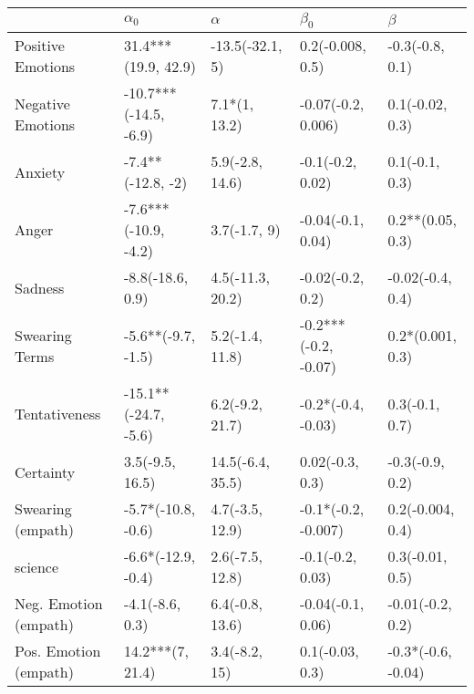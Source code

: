 \begin{tabular}{lllll}
\toprule
{} &             $\alpha_0$ &          $\alpha$ &             $\beta_0$ &             $\beta$ \\
\midrule
Positive Emotions     &    31.4***(19.9, 42.9) &   -13.5(-32.1, 5) &      0.2(-0.008, 0.5) &     -0.3(-0.8, 0.1) \\
Negative Emotions     &  -10.7***(-14.5, -6.9) &     7.1*(1, 13.2) &    -0.07(-0.2, 0.006) &     0.1(-0.02, 0.3) \\
Anxiety               &      -7.4**(-12.8, -2) &   5.9(-2.8, 14.6) &      -0.1(-0.2, 0.02) &      0.1(-0.1, 0.3) \\
Anger                 &   -7.6***(-10.9, -4.2) &      3.7(-1.7, 9) &     -0.04(-0.1, 0.04) &    0.2**(0.05, 0.3) \\
Sadness               &       -8.8(-18.6, 0.9) &  4.5(-11.3, 20.2) &      -0.02(-0.2, 0.2) &    -0.02(-0.4, 0.4) \\
Swearing Terms        &     -5.6**(-9.7, -1.5) &   5.2(-1.4, 11.8) &  -0.2***(-0.2, -0.07) &    0.2*(0.001, 0.3) \\
Tentativeness         &   -15.1**(-24.7, -5.6) &   6.2(-9.2, 21.7) &    -0.2*(-0.4, -0.03) &      0.3(-0.1, 0.7) \\
Certainty             &        3.5(-9.5, 16.5) &  14.5(-6.4, 35.5) &       0.02(-0.3, 0.3) &     -0.3(-0.9, 0.2) \\
Swearing (empath)     &     -5.7*(-10.8, -0.6) &   4.7(-3.5, 12.9) &   -0.1*(-0.2, -0.007) &    0.2(-0.004, 0.4) \\
science               &     -6.6*(-12.9, -0.4) &   2.6(-7.5, 12.8) &      -0.1(-0.2, 0.03) &     0.3(-0.01, 0.5) \\
Neg. Emotion (empath) &        -4.1(-8.6, 0.3) &   6.4(-0.8, 13.6) &     -0.04(-0.1, 0.06) &    -0.01(-0.2, 0.2) \\
Pos. Emotion (empath) &       14.2***(7, 21.4) &     3.4(-8.2, 15) &       0.1(-0.03, 0.3) &  -0.3*(-0.6, -0.04) \\
\bottomrule
\end{tabular}
